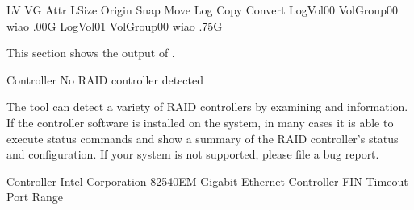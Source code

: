 \documentclass[letterpaper,10pt,english]{sphinxmanual}
\begin{document}
\begin{sphinxVerbatim}[commandchars=\\\{\}]
LV       VG         Attr   LSize   Origin Snap\PYGZpc{} Move Log Copy\PYGZpc{} Convert
LogVol00 VolGroup00 \PYGZhy{}wi\PYGZhy{}ao .00G
LogVol01 VolGroup00 \PYGZhy{}wi\PYGZhy{}ao   .75G
\end{sphinxVerbatim}

\sphinxAtStartPar
This section shows the output of .

\begin{sphinxVerbatim}[commandchars=\\\{\}]
  Controller  No RAID controller detected
\end{sphinxVerbatim}

\sphinxAtStartPar
The tool can detect a variety of RAID controllers by examining  and
 information. If the controller software is installed on the system, in
many cases it is able to execute status commands and show a summary of the RAID
controller’s status and configuration. If your system is not supported, please
file a bug report.

\begin{sphinxVerbatim}[commandchars=\\\{\}]
  Controller  Intel Corporation 82540EM Gigabit Ethernet Controller
 FIN Timeout  
  Port Range  
\end{sphinxVerbatim}
\end{document}
